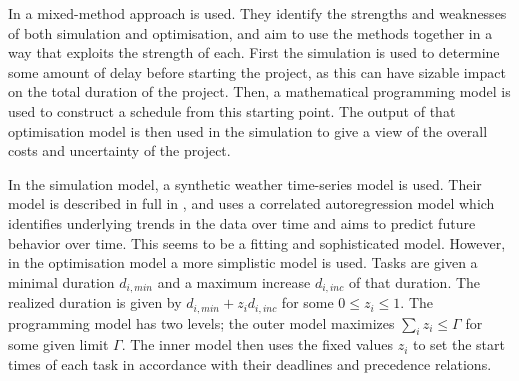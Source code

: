 \documentclass[a4paper,12pt]{article}
\begin{document}
\bigskip

In \cite{barlow2018mixed} a mixed-method approach is used. They identify the strengths and weaknesses of both simulation and optimisation, and aim to use the methods together in a way that exploits the strength of each. First the simulation is used to determine some amount of delay before starting the project, as this can have sizable impact on the total duration of the project. Then, a mathematical programming model is used to construct a schedule from this starting point. The output of that optimisation model is then used in the simulation to give a view of the overall costs and uncertainty of the project. 

In the simulation model, a synthetic weather time-series model is used. Their model is described in full in \cite{dinwoodie2014operational} , and uses a correlated autoregression model which identifies underlying trends in the data over time and aims to predict future behavior over time. This seems to be a fitting and sophisticated model. However, in the optimisation model a more simplistic model is used. Tasks are given a minimal duration $d_{i, min}$ and a maximum increase $d_{i, inc}$ of that duration. The realized duration is given by $d_{i,  min} + z_i d_{i, inc}$ for some $0 \leq z_i \leq 1$. The programming model has two levels; the outer model maximizes $\sum_i z_i \leq \Gamma$ for some given limit $\Gamma$. The inner model then uses the fixed values $z_i$ to set the start times of each task in accordance with their deadlines and precedence relations. 
\end{document}
